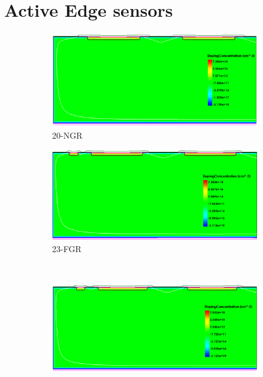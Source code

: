 \chapter{Active Edge sensors}
\label{sec:appendixActiveEdge}
\begin{figure}[htbp]
  \centering
  \begin{subfigure}[b]{0.5\linewidth}
    \includegraphics[width=\textwidth]{figures/TCAD/dopingConcentration_NoGR.png}
    \caption{20-NGR}
  \end{subfigure}\hfill
  \begin{subfigure}[b]{0.5\linewidth}
    \includegraphics[width=\textwidth]{figures/TCAD/dopingConcentration_FloatGR.png}
    \caption{23-FGR}
  \end{subfigure} \\
  \begin{subfigure}[b]{0.5\linewidth}
    \includegraphics[width=\textwidth]{figures/TCAD/dopingConcentration_28_GNDGR.png}

\end{subfigure}
\end{figure}
